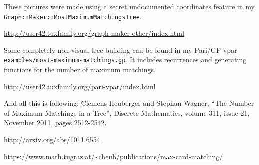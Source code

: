 \documentclass[a4paper]{article}
\newcommand\MySlash{\slash\hspace{0pt}}
\begin{document}
\begin{center}
\end{center}

\vspace{3\baselineskip}

These pictures were made using a secret undocumented coordinates
feature in my
\texttt{Graph::\linebreak[0]Maker::\linebreak[0]MostMaximumMatchingsTree}.

\url{http://user42.tuxfamily.org/graph-maker-other/index.html}

\medskip

Some completely non\hyp{}visual tree building can be found in my
Pari\MySlash{}GP vpar
\texttt{examples/\linebreak[0]most-\linebreak[0]maximum-\linebreak[0]matchings.gp}.
It includes recurrences and generating functions for the number of
maximum matchings.

\url{http://user42.tuxfamily.org/pari-vpar/index.html}

\medskip

And all this is following: Clemens Heuberger and Stephan Wagner, ``The
Number of Maximum Matchings in a Tree'', Discrete Mathematics, volume
311, issue 21, November 2011, pages 2512-2542.

\url{http://arxiv.org/abs/1011.6554}

\url{https://www.math.tugraz.at/~cheub/publications/max-card-matching/}


\end{document}
